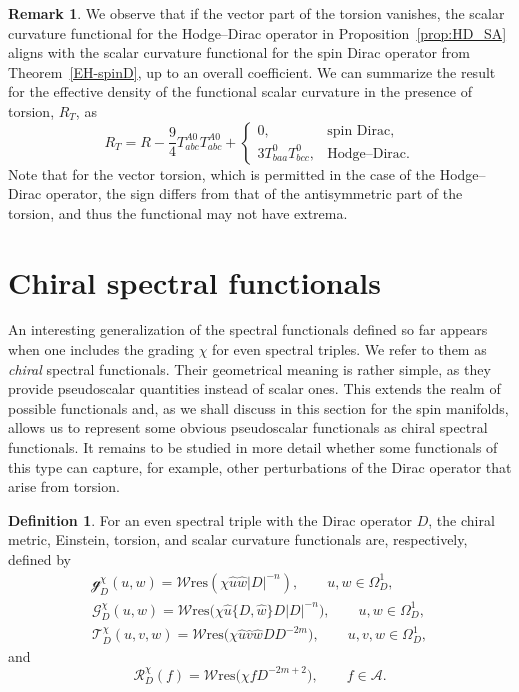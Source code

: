 \documentclass[pdftex]{sigma}
\numberwithin{equation}{section}
\theoremstyle{definition}
\newtheorem{Definition}[Theorem]{Definition}
\newtheorem{Remark}[Theorem]{Remark}
\def\W{\mathscr{W} \mathrm{res}}
\begin{document}
\begin{Remark}
 We observe that if the vector part of the torsion vanishes, the scalar curvature functional for the Hodge--Dirac operator in Proposition~\ref{prop:HD_SA} aligns with the scalar curvature functional for the spin Dirac operator from Theorem~\ref{EH-spinD}, up to an overall coefficient. We can summarize the result for the effective density of the functional scalar curvature in the presence of torsion, $R_T$, as
 \[
 R_T=R-
 \frac{9}{4}T^{A0}_{abc}T^{A0}_{abc}+\begin{cases}
 0,& \mbox{spin Dirac},\\
 3T^0_{baa}T^0_{bcc}, & \mbox{Hodge--Dirac}.
 \end{cases}
 \]
Note that for the vector torsion, which is permitted in the case of the Hodge--Dirac operator, the sign differs from that of the antisymmetric part of the torsion, and thus the functional may not have extrema.
\end{Remark}

\section{Chiral spectral functionals}
An interesting generalization of the spectral functionals defined so far appears when one includes the grading $\chi$
for even spectral triples. We refer to them as \emph{chiral} spectral functionals.
Their geometrical meaning is rather simple, as they provide
pseudoscalar quantities instead of scalar ones. This extends the realm of
possible functionals and, as we shall discuss in this section for the spin manifolds, allows us to represent some obvious pseudoscalar functionals as
chiral spectral functionals. It remains to be studied in more detail whether
some functionals of this type can capture, for example, other perturbations
of the Dirac operator that arise from torsion.
\begin{Definition}
For an even spectral triple with the Dirac operator $D$, the chiral metric, Einstein, torsion, and scalar curvature functionals are, respectively, defined by
\begin{gather*}
\mathscr{g}^\chi_D(u,w)=\W(\chi \hat{u}\hat{w}|D|^{-n}), \qquad u,w\in \Omega_D^1, \\
	\mathscr{G}_D^\chi(u,w)=\W\bigl(\chi\hat{u}\{D,\hat{w}\} D |D|^{-n}\bigr), \qquad u,w\in \Omega_D^1, \\
	\mathscr{T}_D^\chi (u,v,w)=\W\bigl(\chi\hat{u}\hat{v}\hat{w}D D^{-2m}\bigr), \qquad u,v,w\in \Omega^1_D,
\end{gather*}
and
\[
 \mathscr{R}_D^\chi(f)=\W\bigl(\chi f D^{-2m+2}\bigr), \qquad f\in \mathcal{A}.
\]
\end{Definition}
\end{document}
